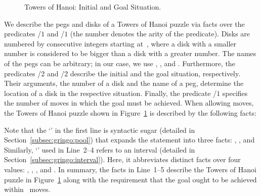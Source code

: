 \begin{figure}[tb]
\centering
\hanoiInstance
\caption{Towers of Hanoi: Initial and Goal Situation.\label{fig:toh_inst}}
\end{figure}
We describe the pegs and disks of a Towers of Hanoi puzzle via facts over the predicates
/$1$ and /$1$ (the number denotes the arity of the predicate).
Disks are numbered by consecutive integers starting at~,
where a disk with a smaller number is considered to be bigger than a disk with a greater number.
The names of the pegs can be arbitrary; in our case, we use , , and . 
Furthermore, the predicates /$2$ and /$2$ describe the initial
and the goal situation, respectively.
Their arguments, the number of a disk and the name of a peg,
determine the location of a disk in the respective situation.
Finally, the predicate /$1$ specifies the number of moves 
in which the goal must be achieved.
When allowing  moves,
the Towers of Hanoi puzzle shown in Figure~\ref{fig:toh_inst} %
is described by the following facts:%
%
%

%
Note that the `\code{;}' in the first line is syntactic sugar
(detailed in Section~\ref{subsec:gringo:pool})
that expands the statement into three facts:
, , and 
Similarly, `' used in Line~2--4
refers to an interval (detailed in Section~\ref{subsec:gringo:interval}).
Here, it abbreviates distinct facts over four values:
, , , and .
In summary, the facts in Line~1--5 describe the 
Towers of Hanoi puzzle in Figure~\ref{fig:toh_inst} along
with the requirement that the goal ought to be achieved within~ moves.

